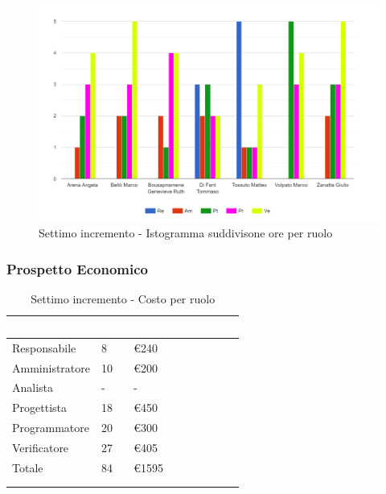 {{      \begin{figure}[H]
        \includegraphics[width=15cm]{sezioni/Images/settimo.png}
        \centering
        \caption{Settimo incremento - Istogramma suddivisone ore per ruolo}
     \end{figure}
    }

    \subsubsection{Prospetto Economico}
    {
        \setlength{\freewidth}{\dimexpr\textwidth-30\tabcolsep}
        \renewcommand{\arraystretch}{1.0}
        \setlength{\aboverulesep}{0pt}
        \setlength{\belowrulesep}{0pt}
        \begin{longtable}{C{.4\freewidth} C{.2\freewidth} C{.2\freewidth} C{.2\freewidth} C{.2\freewidth} C{.2\freewidth} C{.2\freewidth} C{.2\freewidth} C{.2\freewidth}}
          \toprule
        \textcolor{white}{\textbf{Ruolo}}&
        \textcolor{white}{\textbf{Ore}}&
        \textcolor{white}{\textbf{Costo}}\\
        \toprule
        \endhead
            
        Responsabile  & 8 & €240\\
        Amministratore  & 10 & €200 \\
        Analista &- & -\\
        Progettista &18 &€450\\
        Programmatore &20 & €300\\
        Verificatore &27 &€405\\
        Totale&84&€1595\\
        \bottomrule
      \\
        \caption{Settimo incremento - Costo per ruolo} 


\end{longtable}}}
